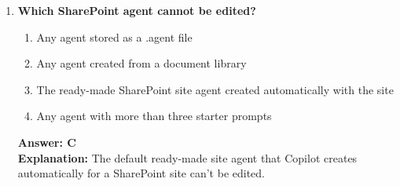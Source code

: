 \documentclass[10pt]{article}
\begin{document}
\begin{enumerate}[leftmargin=*]
\item \textbf{Which SharePoint agent cannot be edited?}
\begin{enumerate}[label=\Alph*.]
  \item Any agent stored as a .agent file
  \item Any agent created from a document library
  \item The ready-made SharePoint site agent created automatically with the site
  \item Any agent with more than three starter prompts
\end{enumerate}
\textbf{Answer: C}\\
\textbf{Explanation:} The default ready-made site agent that Copilot creates automatically for a SharePoint site can't be edited.

\end{enumerate}

\clearpage
\end{document}
